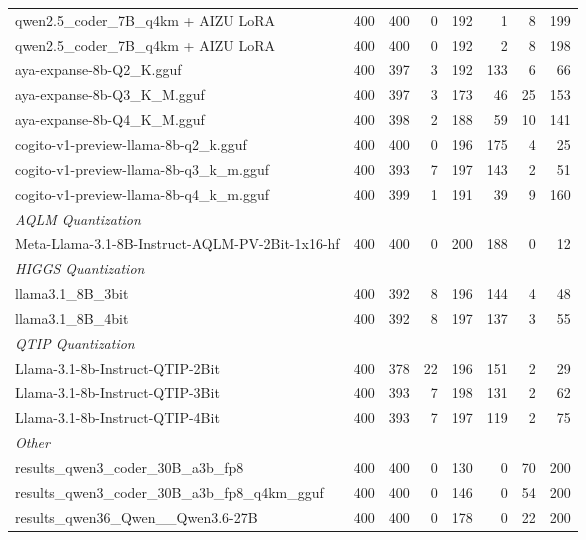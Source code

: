 \begin{table}[htbp]
{\begin{tabular}{lrrrrrrr}
    qwen2.5\_coder\_7B\_q4km + AIZU LoRA & 400 & 400 & 0 & 192 & 1 & 8 & 199 \\
    qwen2.5\_coder\_7B\_q4km + AIZU LoRA & 400 & 400 & 0 & 192 & 2 & 8 & 198 \\
    aya-expanse-8b-Q2\_K.gguf & 400 & 397 & 3 & 192 & 133 & 6 & 66 \\
    aya-expanse-8b-Q3\_K\_M.gguf & 400 & 397 & 3 & 173 & 46 & 25 & 153 \\
    aya-expanse-8b-Q4\_K\_M.gguf & 400 & 398 & 2 & 188 & 59 & 10 & 141 \\
    cogito-v1-preview-llama-8b-q2\_k.gguf & 400 & 400 & 0 & 196 & 175 & 4 & 25 \\
    cogito-v1-preview-llama-8b-q3\_k\_m.gguf & 400 & 393 & 7 & 197 & 143 & 2 & 51 \\
    cogito-v1-preview-llama-8b-q4\_k\_m.gguf & 400 & 399 & 1 & 191 & 39 & 9 & 160 \\
    \midrule
    \multicolumn{8}{l}{\textit{AQLM Quantization}} \\
    \midrule
    Meta-Llama-3.1-8B-Instruct-AQLM-PV-2Bit-1x16-hf & 400 & 400 & 0 & 200 & 188 & 0 & 12 \\
    \midrule
    \multicolumn{8}{l}{\textit{HIGGS Quantization}} \\
    \midrule
    llama3.1\_8B\_3bit & 400 & 392 & 8 & 196 & 144 & 4 & 48 \\
    llama3.1\_8B\_4bit & 400 & 392 & 8 & 197 & 137 & 3 & 55 \\
    \midrule
    \multicolumn{8}{l}{\textit{QTIP Quantization}} \\
    \midrule
    Llama-3.1-8b-Instruct-QTIP-2Bit & 400 & 378 & 22 & 196 & 151 & 2 & 29 \\
    Llama-3.1-8b-Instruct-QTIP-3Bit & 400 & 393 & 7 & 198 & 131 & 2 & 62 \\
    Llama-3.1-8b-Instruct-QTIP-4Bit & 400 & 393 & 7 & 197 & 119 & 2 & 75 \\
    \midrule
    \multicolumn{8}{l}{\textit{Other}} \\
    \midrule
    results\_qwen3\_coder\_30B\_a3b\_fp8 & 400 & 400 & 0 & 130 & 0 & 70 & 200 \\
    results\_qwen3\_coder\_30B\_a3b\_fp8\_q4km\_gguf & 400 & 400 & 0 & 146 & 0 & 54 & 200 \\
    results\_qwen36\_Qwen\_\_Qwen3.6-27B & 400 & 400 & 0 & 178 & 0 & 22 & 200 \\
    \bottomrule
  \end{tabular}
  }
\end{table}

